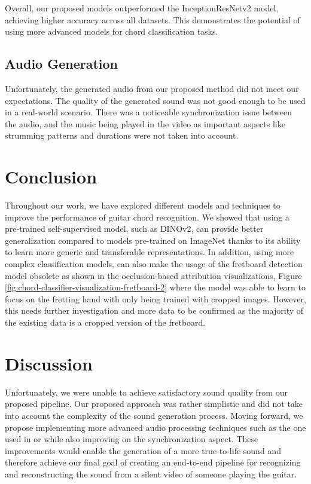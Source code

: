 \documentclass[10pt,twocolumn,letterpaper]{article}
\begin{document}
Overall, our proposed models outperformed the InceptionResNetv2 model, achieving higher accuracy across all datasets. This demonstrates the potential of using more advanced models for chord classification tasks.

\subsection{Audio Generation}
Unfortunately, the generated audio from our proposed method did not meet our expectations. The quality of the generated sound was not good enough to be used in a real-world scenario. There was a noticeable synchronization issue between the audio, and the music being played in the video as important aspects like strumming patterns and durations were not taken into account.

\section{Conclusion}
Throughout our work, we have explored different models and techniques to improve the performance of guitar chord recognition. We showed that using a pre-trained self-supervised model, such as DINOv2, can provide better generalization compared to models pre-trained on ImageNet thanks to its ability to learn more generic and transferable representations. In addition, using more complex classification models, can also make the usage of the fretboard detection model obsolete as shown in the occlusion-based attribution visualizations, Figure \ref{fig:chord-classifier-visualization-fretboard-2} where the model was able to learn to focus on the fretting hand with only being trained with cropped images. However, this needs further investigation and more data to be confirmed as the majority of the existing data is a cropped version of the fretboard.

\section{Discussion}
Unfortunately, we were unable to achieve satisfactory sound quality from our proposed pipeline. Our proposed approach was rather simplistic and did not take into account the complexity of the sound generation process. Moving forward, we propose implementing more advanced audio processing techniques such as the one used in \cite{su2020audeo} or \cite{li2023melodydiffusion} while also improving on the synchronization aspect. These improvements would enable the generation of a more true-to-life sound and therefore achieve our final goal of creating an end-to-end pipeline for recognizing and reconstructing the sound from a silent video of someone playing the guitar.

    {\small
        
        
    }
\end{document}
